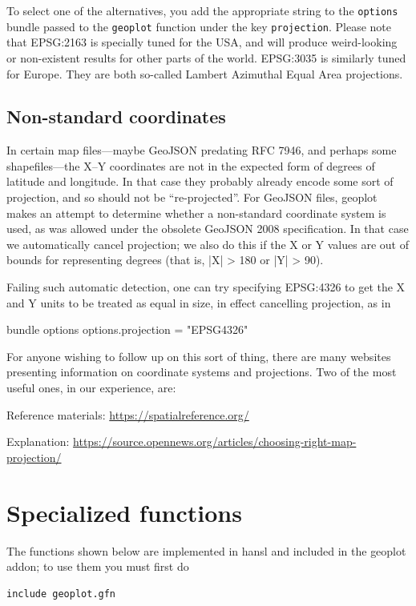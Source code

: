 \documentclass{article}
\newcommand{\myappendix}[1]{%
\addtocounter{appcount}{1}
\section{#1}}
\begin{document}
To select one of the alternatives, you add the appropriate string to
the \texttt{options} bundle passed to the \texttt{geoplot} function
under the key \texttt{projection}. Please note that \textsf{EPSG:2163}
is specially tuned for the USA, and will produce weird-looking or
non-existent results for other parts of the world. \textsf{EPSG:3035}
is similarly tuned for Europe. They are both so-called Lambert
Azimuthal Equal Area projections.

\subsection*{Non-standard coordinates}

In certain map files---maybe GeoJSON predating RFC 7946, and perhaps
some shapefiles---the X--Y coordinates are not in the expected form of
degrees of latitude and longitude. In that case they probably already
encode some sort of projection, and so should not be ``re-projected''.
For GeoJSON files, \textsf{geoplot} makes an attempt to determine
whether a non-standard coordinate system is used, as was allowed under
the obsolete GeoJSON 2008 specification. In that case we automatically
cancel projection; we also do this if the X or Y values are out of
bounds for representing degrees (that is, |X| > 180 or |Y| > 90).

Failing such automatic detection, one can try specifying
\textsf{EPSG:4326} to get the X and Y units to be treated as equal in
size, in effect cancelling projection, as in
\begin{code}
bundle options
options.projection = "EPSG4326"
\end{code}

For anyone wishing to follow up on this sort of thing, there are many
websites presenting information on coordinate systems and
projections. Two of the most useful ones, in our experience, are:

Reference materials: \url{https://spatialreference.org/}

Explanation:
\url{https://source.opennews.org/articles/choosing-right-map-projection/}

\clearpage
\myappendix{Specialized functions}
\label{app:special}

The functions shown below are implemented in hansl and included in the
\textsf{geoplot} addon; to use them you must first do
\begin{verbatim}
include geoplot.gfn
\end{verbatim}
\end{document}
